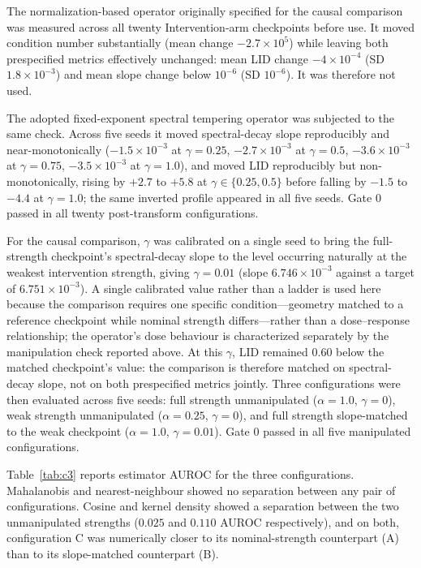 The normalization-based operator originally specified for the causal
comparison was measured across all twenty Intervention-arm checkpoints before
use. It moved condition number substantially (mean change $-2.7\times10^{5}$)
while leaving both prespecified metrics effectively unchanged: mean LID
change $-4\times10^{-4}$ (SD $1.8\times10^{-3}$) and mean slope change below
$10^{-6}$ (SD $10^{-6}$). It was therefore not used.

The adopted fixed-exponent spectral tempering operator was subjected to the
same check. Across five seeds it moved spectral-decay slope reproducibly and
near-monotonically ($-1.5\times10^{-3}$ at $\gamma = 0.25$, $-2.7\times10^{-3}$
at $\gamma = 0.5$, $-3.6\times10^{-3}$ at $\gamma = 0.75$, $-3.5\times10^{-3}$
at $\gamma = 1.0$), and moved LID reproducibly but non-monotonically, rising
by $+2.7$ to $+5.8$ at $\gamma \in \{0.25, 0.5\}$ before falling by $-1.5$ to
$-4.4$ at $\gamma = 1.0$; the same inverted profile appeared in all five
seeds. Gate 0 passed in all twenty post-transform configurations.

For the causal comparison, $\gamma$ was calibrated on a single seed to bring
the full-strength checkpoint's spectral-decay slope to the level occurring
naturally at the weakest intervention strength, giving $\gamma = 0.01$
(slope $6.746\times10^{-3}$ against a target of $6.751\times10^{-3}$). A
single calibrated value rather than a ladder is used here because the
comparison requires one specific condition---geometry matched to a reference
checkpoint while nominal strength differs---rather than a dose--response
relationship; the operator's dose behaviour is characterized separately by
the manipulation check reported above. At this
$\gamma$, LID remained $0.60$ below the matched checkpoint's value: the
comparison is therefore matched on spectral-decay slope, not on both
prespecified metrics jointly. Three configurations were then evaluated
across five seeds: full strength unmanipulated ($\alpha = 1.0$,
$\gamma = 0$), weak strength unmanipulated ($\alpha = 0.25$, $\gamma = 0$),
and full strength slope-matched to the weak checkpoint ($\alpha = 1.0$,
$\gamma = 0.01$). Gate 0 passed in all five manipulated configurations.

Table~\ref{tab:c3} reports estimator AUROC for the three configurations.
Mahalanobis and nearest-neighbour showed no separation between any pair of
configurations. Cosine and kernel density showed a separation between the
two unmanipulated strengths ($0.025$ and $0.110$ AUROC respectively), and on
both, configuration C was numerically closer to its nominal-strength
counterpart (A) than to its slope-matched counterpart (B).

